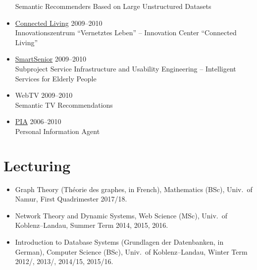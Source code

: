 \documentclass[line,mm]{res}
\newcounter{y}
\begin{document}
\begin{resume}
\begin{itemize}
  Semantic Recommenders Based on Large Unstructured Datasets
\item \href{http://www.connected-living.org/}{Connected Living} \hfill 2009--2010 \\
   Innovationszentrum ``Vernetztes Leben'' -- Innovation Center ``Connected Living''
\item \href{http://www1.smart-senior.de/}{SmartSenior} \hfill 2009--2010 \\
  Subproject Service Infrastructure and Usability Engineering -- Intelligent Services for Elderly People
\item WebTV \hfill 2009--2010 \\
  Semantic TV Recommendations
\item \href{http://pia-services.de/}{PIA} \hfill 2006--2010 \\
  Personal Information Agent 
\end{itemize}

\section{Lecturing}
\begin{itemize}
\item Graph Theory (Théorie des graphes, in French), Mathematics (BSc),
  Univ.\ of Namur, First Quadrimester 2017/18.   
\item Network Theory and Dynamic Systems, Web Science (MSc), Univ.\ of
  Koblenz--Landau, Summer Term 2014, 2015, 2016.   
\item Introduction to Database Systems (Grundlagen der Datenbanken, in
  German), Computer Science (BSc), Univ.\ of Koblenz--Lan\-dau, 
  Winter Term 2012/, 2013/, 2014/15, 2015/16.
\end{itemize}


\end{resume}
\end{document}
